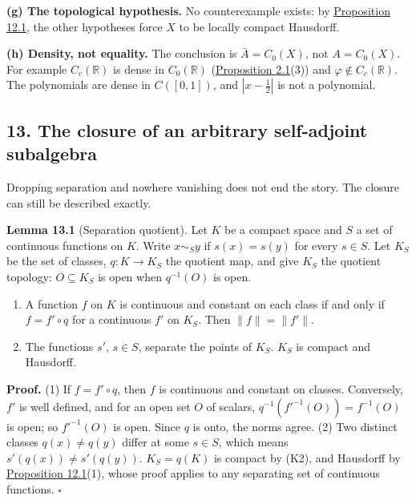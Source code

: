 \documentclass[
  english,
  11pt,
  a4paper,
]{article}
\providecommand{\tightlist}{%
  \setlength{\itemsep}{0pt}\setlength{\parskip}{0pt}}
\begin{document}
\textbf{(g) The topological hypothesis.} No counterexample exists: by
\hyperlink{the-stone-weierstrass-theorem-for-functions-vanishing-at-infinity--oa-fnd-sw-10}{Proposition
12.1}, the other hypotheses force \(X\) to be locally compact Hausdorff.

\textbf{(h) Density, not equality.} The conclusion is \(\bar A=C_0(X)\),
not \(A=C_0(X)\). For example \(C_c(\mathbb R)\) is dense in
\(C_0(\mathbb R)\)
(\hyperlink{the-stone-weierstrass-theorem-for-functions-vanishing-at-infinity--oa-fnd-sw-01}{Proposition
2.1}(3)) and \(\varphi\notin C_c(\mathbb R)\). The polynomials are dense
in \(C([0,1])\), and \(|x-\frac12|\) is not a polynomial.

\subsection[13. The closure of an arbitrary self-adjoint
subalgebra]{\texorpdfstring{\protect\hypertarget{the-stone-weierstrass-theorem-for-functions-vanishing-at-infinity--oa-fnd-sw-12}{}{}13.
The closure of an arbitrary self-adjoint
subalgebra}{13. The closure of an arbitrary self-adjoint subalgebra}}\label{the-stone-weierstrass-theorem-for-functions-vanishing-at-infinity--OA-FND-SW-12}

Dropping separation and nowhere vanishing does not end the story. The
closure can still be described exactly.

\textbf{Lemma 13.1} (Separation quotient). Let \(K\) be a compact space
and \(S\) a set of continuous functions on \(K\). Write \(x\sim_Sy\) if
\(s(x)=s(y)\) for every \(s\in S\). Let \(K_S\) be the set of classes,
\(q:K\to K_S\) the quotient map, and give \(K_S\) the quotient topology:
\(O\subseteq K_S\) is open when \(q^{-1}(O)\) is open.

\begin{enumerate}
\tightlist
\item
  A function \(f\) on \(K\) is continuous and constant on each class if
  and only if \(f=f'\circ q\) for a continuous \(f'\) on \(K_S\). Then
  \(\|f\|=\|f'\|\).
\item
  The functions \(s'\), \(s\in S\), separate the points of \(K_S\).
  \(K_S\) is compact and Hausdorff.
\end{enumerate}

\textbf{Proof.} (1) If \(f=f'\circ q\), then \(f\) is continuous and
constant on classes. Conversely, \(f'\) is well defined, and for an open
set \(O\) of scalars, \(q^{-1}(f'^{-1}(O))=f^{-1}(O)\) is open; so
\(f'^{-1}(O)\) is open. Since \(q\) is onto, the norms agree. (2) Two
distinct classes \(q(x)\neq q(y)\) differ at some \(s\in S\), which
means \(s'(q(x))\neq s'(q(y))\). \(K_S=q(K)\) is compact by (K2), and
Hausdorff by
\hyperlink{the-stone-weierstrass-theorem-for-functions-vanishing-at-infinity--oa-fnd-sw-10}{Proposition
12.1}(1), whose proof applies to any separating set of continuous
functions. \(\square\)
\end{document}
